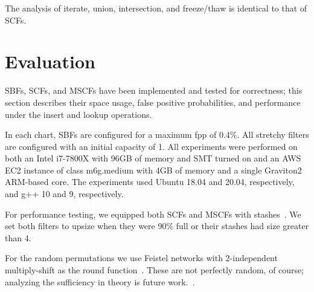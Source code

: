 \documentclass[letterpaper,twocolumn,10pt]{article}
\newcommand{\taffy}{stretchy}
\newcommand{\TBF}{SBF}
\newcommand{\TCF}{SCF}
\newcommand{\MTCF}{MSCF}
\newcommand{\taffy}{taffy}
\newcommand{\TBF}{TBF}
\newcommand{\TCF}{TCF}
\newcommand{\MTCF}{MTCF}
\begin{document}
The analysis of iterate, union, intersection, and freeze/thaw is identical to that of \TCF{}s.



\section{Evaluation}
\label{eval}


\TBF{}s, \TCF{}s, and \MTCF{}s have been implemented and tested for correctness; this section describes their space usage, false positive probabilities, and performance under the insert and lookup operations.

In each chart, \TBF{}s are configured for a maximum fpp of 0.4\%.
All \taffy{} filters are configured with an initial capacity of 1. %
All experiments were performed on both an Intel i7-7800X with 96GB of memory and SMT turned on and an AWS EC2 instance of class m6g.medium with 4GB of memory and a single Graviton2 ARM-based core.
The experiments used Ubuntu 18.04 and 20.04, respectively, and g++ 10 and 9, respectively.

For performance testing, we equipped both \TCF{}s and \MTCF{}s with stashes~\cite{stash}.
We set both filters to upsize when they were 90\% full or their stashes had size greater than 4.

For the random permutations we use Feistel networks with 2-independent multiply-shift as the round function~\cite{two-independent-multiply-shift}.
These are not perfectly random, of course; analyzing the sufficiency in theory is future work.~\cite{why-simple,backyard}.
\end{document}
